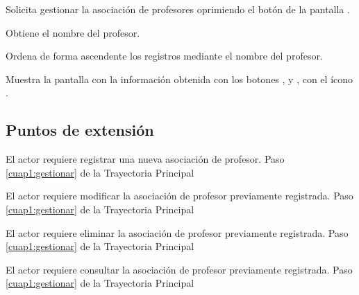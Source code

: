 \begin{UCtrayectoria}
	
	\UCpaso [\UCactor] Solicita gestionar la asociación de profesores oprimiendo el botón  de la pantalla .
	
	\UCpaso [\UCsist] Obtiene el nombre del profesor.
	
	\UCpaso [\UCsist] Ordena de forma ascendente los registros mediante el nombre del profesor.
	
	\UCpaso[\UCsist] Muestra la pantalla  con la información obtenida con los botones ,  y , con el ícono \btnRegistrar. \label{cuap1:gestionar}
\end{UCtrayectoria}

\subsection{Puntos de extensión}

\UCExtensionPoint 
{El actor requiere registrar una nueva asociación de profesor.}
{Paso \ref{cuap1:gestionar} de la Trayectoria Principal}
{}

\UCExtensionPoint 
{El actor requiere modificar la asociación de profesor previamente registrada.}
{Paso \ref{cuap1:gestionar} de la Trayectoria Principal}
{}

\UCExtensionPoint 
{El actor requiere eliminar la asociación de profesor previamente registrada.}
{Paso \ref{cuap1:gestionar} de la Trayectoria Principal}
{}

\UCExtensionPoint 
{El actor requiere consultar la asociación de profesor previamente registrada.}
{Paso \ref{cuap1:gestionar} de la Trayectoria Principal}
{}


